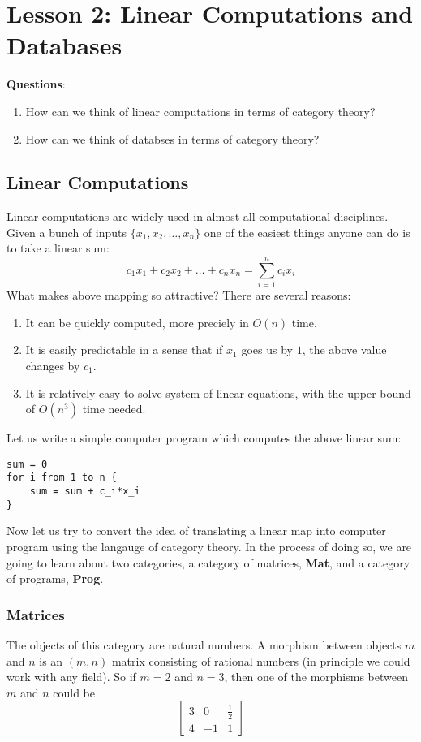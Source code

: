 \documentclass{report}
\theoremstyle{definition}
\begin{document}
\chapter*{Lesson 2: Linear Computations and Databases}
\textbf{Questions}:\\
\begin{enumerate}
\item How can we think of linear computations in terms of category theory?
\item How can we think of databses in terms of category theory?
\end{enumerate}

\section*{Linear Computations}
Linear computations are widely used in almost all computational disciplines. Given a bunch of inputs $\{x_1,x_2,\ldots,x_n \}$ one of the easiest things anyone can do is to take a linear sum:
\[
c_1x_1 + c_2x_2 + \ldots + c_nx_n = \sum_{i=1}^n c_ix_i
\]
What makes above mapping so attractive? There are several reasons:
\begin{enumerate}
	\item It can be quickly computed, more preciely in $O(n)$ time.
	\item It is easily predictable in a sense that if $x_1$ goes us by $1$, the above value changes by $c_1$.
	\item It is relatively easy to solve system of linear equations, with the upper bound of $O(n^3)$ time needed.
\end{enumerate}
Let us write a simple computer program which computes the above linear sum:
\begin{verbatim}
sum = 0
for i from 1 to n {
	sum = sum + c_i*x_i
}
\end{verbatim}
Now let us try to convert the idea of translating a linear map into computer program using the langauge of category theory. In the process of doing so, we are going to learn about two categories, a category of matrices, \textbf{Mat}, and a category of programs, \textbf{Prog}.

\subsection*{Matrices}
The objects of this category are natural numbers. A morphism between objects $m$ and $n$ is an $(m,n)$ matrix consisting of rational numbers (in principle we could work with any field). So if $m=2$ and $n=3$, then one of the morphisms between $m$ and $n$ could be 
\[
\begin{bmatrix}
3 & 0 & \frac{1}{2}\\
4 & -1 & 1
\end{bmatrix}
\]
\end{document}
